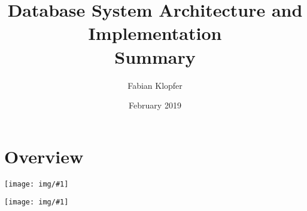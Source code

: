 \documentclass{report}
\title{Database System Architecture and Implementation \\
Summary}
\author{Fabian Klopfer}
\date{February 2019}
\newcommand{\img}[1]{\begin{center}
    \texttt{[image: img/\#1]}
\end{center} }
\begin{document}
\maketitle
\tableofcontents
\newpage
\section*{Overview}
\img{architecture_overview.png} 
\img{topic_overview.png}





\end{document}

